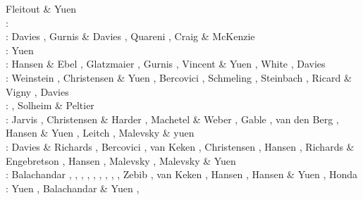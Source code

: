 \begin{scriptsize}
                     Fleitout \& Yuen \cite{flyu84,flyu84b}\\
\nineteeneightyfive: \cite{jarv85}\cite{baum85}\cite{chri85}\cite{csra85}\cite{scan85}\\
\nineteeneightysix: Davies \cite{davi86}, Gurnis \& Davies \cite{guda86},
                    Quareni \etal \cite{quys86}, Craig \& McKenzie \cite{crmc86}\\
\nineteeneightyseven: Yuen \etal{}\cite{yuqh87}\\
\nineteeneightyeight: Hansen \& Ebel \cite{haeb88}, Glatzmaier \cite{glat88}, 
                      Gurnis \cite{gurn88}, Vincent \& Yuen \cite{viyu88},
                      White \cite{whit88}, Davies \cite{davi88}  \\ 
\nineteeneightynine: Weinstein \etal \cite{weoy89}, Christensen \& Yuen \cite{chyu89},
                     Bercovici \etal \cite{besg89}, Schmeling \cite{schm89},
                     Steinbach \etal \cite{sthe89}, Ricard \& Vigny \cite{rivi89},
                     Davies \cite{davi89}\\
\nineteenninety: \cite{trab90}\cite{gurn90}\cite{ketu90}, Solheim \& Peltier \cite{sope90}\\
\nineteenninetyone: Jarvis \cite{jarv91}, Christensen \& Harder \cite{chha91},
                    Machetel \& Weber \cite{mawe91}, Gable \etal \cite{gaot91},
                    van den Berg \etal \cite{vayv91}, Hansen \& Yuen \cite{hayk91},
                    Leitch \etal \cite{leys91} , Malevsky \& yuen \cite{mayu91}\\
\nineteenninetytwo: Davies \& Richards \cite{dari92}, Bercovici \etal \cite{besg92},
                    van Keken \etal{} \cite{vayv92},
                    Christensen \cite{chri92}, Hansen \etal \cite{haym92}, 
                    Richards \& Engebretson \cite{rien92}, Hansen \etal \cite{hayk92},
                    Malevsky \etal \cite{mayw92}, Malevsky \& Yuen \cite{mayu92} \\
\nineteenninetythree: Balachandar \etal \cite{bayr93}, \cite{zhch93},
                      \cite{jarv93}, \cite{tack93},
                       \cite{carm93},
                      \cite{vavy93}, \cite{tasg93},
                      \cite{zhgu93}, \cite{mamc93},
                      Zebib \cite{zebi93}, van Keken \etal \cite{vayv93}, 
                      Hansen \etal \cite{hayk93}, Hansen \& Yuen \cite{hayu93},
                      Honda \etal \cite{hoyb93,hoby93}\\
\nineteenninetyfour: Yuen \etal \cite{yurb94}, Balachandar \& Yuen \cite{bayu94}, \cite{haeb94}

\end{scriptsize}

